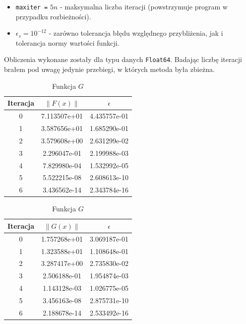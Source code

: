 \documentclass[11pt,wide]{mwart}
\begin{document}
\begin{itemize}
\item \texttt{maxiter =} $ 5n $ - maksymalna liczba iteracji (powstrzymuje program w przypadku rozbieżności).
\item $ \epsilon_s = 10^{-12} $ - zarówno tolerancja błędu względnego przybliżenia, jak i tolerancja normy wartości funkcji.
\end{itemize}

Obliczenia wykonane zostały dla typu danych \texttt{Float64}. Badając liczbę iteracji brałem pod uwagę jedynie przebiegi, w których metoda była zbieżna.

\begin{center}
\begin{table}[!htb]
\caption{Przykładowy przebieg metody Newtona dla układu rozmiaru $ n = 20 $ }
    \begin{subtable}{.5\linewidth}
      \centering
      \caption{Funkcja $ F $}
\begin{tabular}{ |c | c | c| } \hline
Iteracja & $\|F(x)\|$ & $\epsilon$ \\ \hline
0 & 7.113507e+01 & 4.435757e-01 \\ 
1 & 3.587656e+01 & 1.685290e-01 \\ 
2 & 3.579608e+00 & 2.631299e-02 \\ 
3 & 2.296047e-01 & 2.199988e-03 \\ 
4 & 7.829980e-04 & 1.532992e-05 \\ 
5 & 5.522215e-08 & 2.608613e-10 \\ 
6 & 3.436562e-14 & 2.343784e-16 \\  \hline
\end{tabular}
\end{subtable}%
\begin{subtable}{.5\linewidth}
\centering
\caption{Funkcja $ G $}
\begin{tabular}{| c | c | c |} \hline
Iteracja & $\|G(x)\|$ & $\epsilon$ \\ \hline
0 & 1.757268e+01 & 3.069187e-01 \\ 
1 & 1.323588e+01 & 1.108648e-01 \\ 
2 & 3.287417e+00 & 2.735830e-02 \\ 
3 & 2.506188e-01 & 1.954874e-03 \\ 
4 & 1.143128e-03 & 1.026775e-05 \\ 
5 & 3.456163e-08 & 2.875731e-10 \\ 
6 & 2.188678e-14 & 2.533492e-16 \\ \hline
\end{tabular}
\end{subtable}
\end{table}
\end{center}
\end{document}
